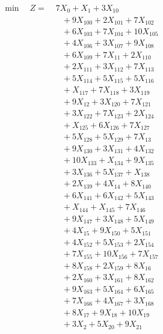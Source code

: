 \documentclass[a4paper,10pt]{article}
\begin{document}
\allowdisplaybreaks
{\small
\begin{align}
\min \quad Z = &\; 7X_{0} + X_{1} + 3X_{10} \\[0.5ex]
&\quad  + 9X_{100} + 2X_{101} + 7X_{102} \\[0.5ex]
&\quad  + 6X_{103} + 7X_{104} + 10X_{105} \\[0.5ex]
&\quad  + 4X_{106} + 3X_{107} + 9X_{108} \\[0.5ex]
&\quad  + 6X_{109} + 7X_{11} + 2X_{110} \\[0.5ex]
&\quad  + 2X_{111} + 3X_{112} + 7X_{113} \\[0.5ex]
&\quad  + 5X_{114} + 5X_{115} + 5X_{116} \\[0.5ex]
&\quad  + X_{117} + 7X_{118} + 3X_{119} \\[0.5ex]
&\quad  + 9X_{12} + 3X_{120} + 7X_{121} \\[0.5ex]
&\quad  + 3X_{122} + 7X_{123} + 2X_{124} \\[0.5ex]
&\quad  + X_{125} + 6X_{126} + 7X_{127} \\[0.5ex]
&\quad  + 5X_{128} + 5X_{129} + 7X_{13} \\[0.5ex]
&\quad  + 9X_{130} + 3X_{131} + 4X_{132} \\[0.5ex]
&\quad  + 10X_{133} + X_{134} + 9X_{135} \\[0.5ex]
&\quad  + 3X_{136} + 5X_{137} + X_{138} \\[0.5ex]
&\quad  + 2X_{139} + 4X_{14} + 8X_{140} \\[0.5ex]
&\quad  + 6X_{141} + 6X_{142} + 5X_{143} \\[0.5ex]
&\quad  + X_{144} + X_{145} + 7X_{146} \\[0.5ex]
&\quad  + 9X_{147} + 3X_{148} + 5X_{149} \\[0.5ex]
&\quad  + 4X_{15} + 9X_{150} + 5X_{151} \\[0.5ex]
&\quad  + 4X_{152} + 5X_{153} + 2X_{154} \\[0.5ex]
&\quad  + 7X_{155} + 10X_{156} + 7X_{157} \\[0.5ex]
&\quad  + 8X_{158} + 2X_{159} + 8X_{16} \\[0.5ex]
&\quad  + 2X_{160} + 3X_{161} + 8X_{162} \\[0.5ex]
&\quad  + 9X_{163} + 5X_{164} + 6X_{165} \\[0.5ex]
&\quad  + 7X_{166} + 4X_{167} + 3X_{168} \\[0.5ex]
&\quad  + 8X_{17} + 9X_{18} + 10X_{19} \\[0.5ex]
&\quad  + 3X_{2} + 5X_{20} + 9X_{21} \\[0.5ex]

\end{align}}
\end{document}
